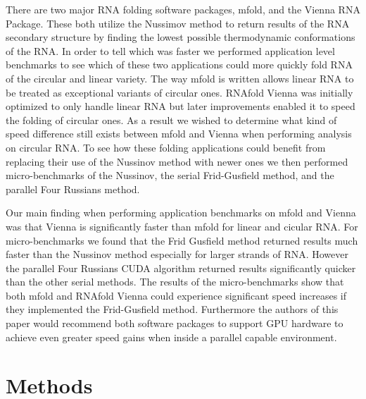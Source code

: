 \documentclass[12pt]{article}
\begin{document}
\par There are two major RNA folding software packages, mfold\cite{zuker1989,zuker1981},
and the Vienna RNA Package\cite{vienna}. These both utilize the Nussimov method
to return results of the RNA secondary structure by finding the lowest possible
thermodynamic conformations of the RNA\cite{zuker1981,vienna}. In order to tell
which was faster we performed application level benchmarks\cite{eulogy} to see
which of these two applications could more quickly fold RNA of
the circular and linear variety. The way mfold is written allows linear RNA to
be treated as exceptional variants of circular ones\cite{circular}. RNAfold
Vienna was initially optimized to only handle linear RNA\cite{circular} but
later improvements enabled it to speed the folding of circular ones\cite{circular}.
As a result we wished to determine what kind of speed difference still exists
between mfold and Vienna when performing analysis on circular RNA. To see how
these folding applications could benefit from replacing their use of the Nussinov
method with newer ones we then performed micro-benchmarks\cite{sysperformance} of the Nussinov,
the serial Frid-Gusfield method, and the parallel Four Russians method.

\par Our main finding when performing application benchmarks on mfold and
Vienna was that Vienna is significantly faster than mfold for linear and cicular
RNA. For micro-benchmarks we found that the Frid Gusfield method
returned results much faster than the Nussinov method especially for larger strands of RNA. However
the parallel Four Russians CUDA algorithm returned results significantly quicker than the other serial
methods. The results of the micro-benchmarks show that both mfold and RNAfold Vienna could experience
significant speed increases if they implemented the Frid-Gusfield method. Furthermore
the authors of this paper would recommend both software packages to support GPU
hardware to achieve even greater speed gains when inside a parallel capable
environment.

\section{Methods}
\end{document}
